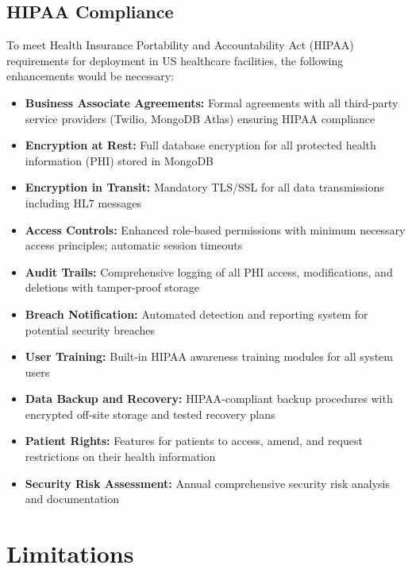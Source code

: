 \documentclass[12pt, a4paper]{report}
\begin{document}
\subsection{HIPAA Compliance}
To meet Health Insurance Portability and Accountability Act (HIPAA) requirements for deployment in US healthcare facilities, the following enhancements would be necessary:
\begin{itemize}
    \item \textbf{Business Associate Agreements:} Formal agreements with all third-party service providers (Twilio, MongoDB Atlas) ensuring HIPAA compliance
    \item \textbf{Encryption at Rest:} Full database encryption for all protected health information (PHI) stored in MongoDB
    \item \textbf{Encryption in Transit:} Mandatory TLS/SSL for all data transmissions including HL7 messages
    \item \textbf{Access Controls:} Enhanced role-based permissions with minimum necessary access principles; automatic session timeouts
    \item \textbf{Audit Trails:} Comprehensive logging of all PHI access, modifications, and deletions with tamper-proof storage
    \item \textbf{Breach Notification:} Automated detection and reporting system for potential security breaches
    \item \textbf{User Training:} Built-in HIPAA awareness training modules for all system users
    \item \textbf{Data Backup and Recovery:} HIPAA-compliant backup procedures with encrypted off-site storage and tested recovery plans
    \item \textbf{Patient Rights:} Features for patients to access, amend, and request restrictions on their health information
    \item \textbf{Security Risk Assessment:} Annual comprehensive security risk analysis and documentation
\end{itemize}

\section{Limitations}
\end{document}
